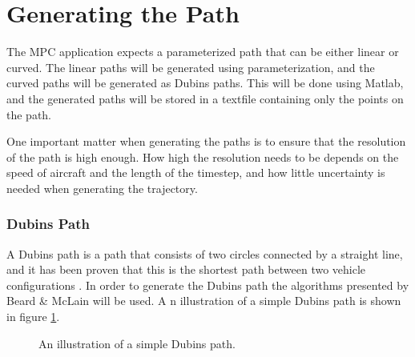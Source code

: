 \section{Generating the Path}

The MPC application expects a parameterized path that can be either linear or curved. The linear paths will be generated using parameterization, and the curved paths will be generated as Dubins paths. This will be done using Matlab, and the generated paths will be stored in a textfile containing only the points on the path.

One important matter when generating the paths is to ensure that the resolution of the path is high enough. How high the resolution needs to be depends on the speed of aircraft and the length of the timestep, and how little uncertainty is needed when generating the trajectory. 


\subsubsection{Dubins Path}

A Dubins path is a path that consists of two circles connected by a straight line, and it has been proven that this is the shortest path between two vehicle configurations \cite{DUBINS}. In order to generate the Dubins path the algorithms presented by Beard \& McLain \cite{uavBEARD} will be used. A n illustration of a simple Dubins path is shown in figure \ref{fig:dubins}.

\begin{figure}[h]
	\centering
	\caption{An illustration of a simple Dubins path.}
	\label{fig:dubins}
\end{figure}